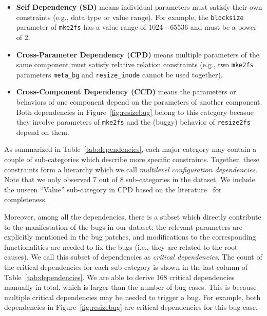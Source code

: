 \begin{itemize}

  \vspace{-0.05in}
    \item \textbf{Self Dependency (SD)} means individual parameters  must satisfy their own  constraints (e.g., data type or value range). For example,  the \texttt{blocksize} parameter of \texttt{mke2fs} has a value range of 1024 - 65536 and must be a power of 2. 
    
    \item \textbf{Cross-Parameter Dependency (CPD)} means multiple parameters of the same component must satisfy relative relation constraints (e.g., two \texttt{mke2fs} parameters \texttt{meta\_bg} and \texttt{resize\_inode} cannot be used together). 
       
    \item \textbf{Cross-Component Dependency (CCD)} means the parameters or behaviors of  one component  depend on the  parameters of another component. 
    Both dependencies   in Figure~\ref{fig:resizebug} belong to this category becasue they involve parameters of \texttt{mke2fs} and the (buggy) behavior of \texttt{resize2fs} depend on them.
    

\end{itemize}

 
As summarized in Table~\ref{tab:dependencies}, 
each major category may contain a couple of sub-categories which describe more specific constraints. 
 Together, these constraints form a hierarchy which we call \textit{multilevel configuration dependencies}.
 Note that we only observed 7 out of 8 sub-categories  in the dataset. We include the  unseen ``Value'' sub-category in CPD based on the literature~\cite{spex} for completeness.

Moreover, among all the dependencies, there is a subset which directly contribute to the manifestation of the bugs in our dataset: the relevant parameters are explicitly mentioned in the bug patches, and modifications to the corresponding functionalities are needed to fix the bugs (i.e., they are related to the root causes). We call this subset of dependencies as \textit{critical dependencies}.
The count of the critical dependencies for each sub-category is shown in the last column of  Table~\ref{tab:dependencies}. 
We are able to derive 168 critical dependencies  manually  in total, which is larger than the number of bug cases. This is because multiple critical dependencies may be needed to trigger a bug. For example, both dependencies in Figure~\ref{fig:resizebug} are critical dependencies for this bug case.

